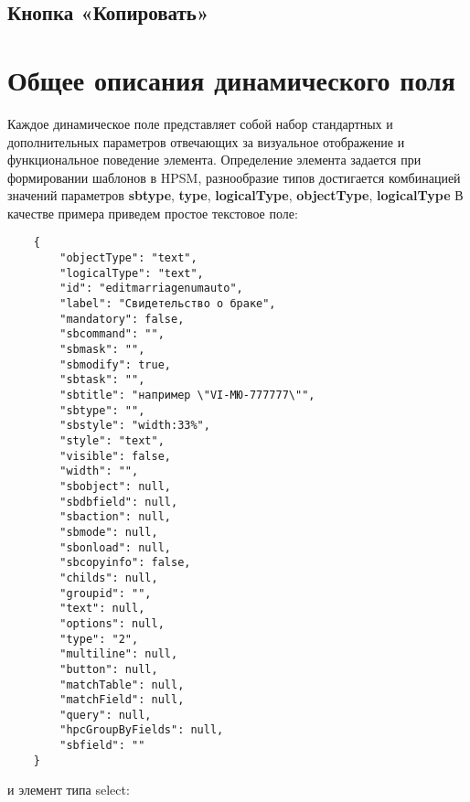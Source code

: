 \documentclass[../index.tex]{subfiles}
\begin{document}
\subsection{Кнопка «Копировать»}


\section{Общее описания динамического поля}
    Каждое динамическое поле представляет собой набор стандартных и дополнительных параметров отвечающих за визуальное отображение и функциональное поведение элемента.
    Определение элемента задается при формировании шаблонов в HPSM, разнообразие типов достигается комбинацией значений параметров \textbf{sbtype}, \textbf{type}, \textbf{logicalType}, \textbf{objectType}, \textbf{logicalType}
    В качестве примера приведем простое текстовое поле:
\begin{verbatim}
    {
        "objectType": "text",
        "logicalType": "text",
        "id": "editmarriagenumauto",
        "label": "Свидетельство о браке",
        "mandatory": false,
        "sbcommand": "",
        "sbmask": "",
        "sbmodify": true,
        "sbtask": "",
        "sbtitle": "например \"VI-МЮ-777777\"",
        "sbtype": "",
        "sbstyle": "width:33%",
        "style": "text",
        "visible": false,
        "width": "",
        "sbobject": null,
        "sbdbfield": null,
        "sbaction": null,
        "sbmode": null,
        "sbonload": null,
        "sbcopyinfo": false,
        "childs": null,
        "groupid": "",
        "text": null,
        "options": null,
        "type": "2",
        "multiline": null,
        "button": null,
        "matchTable": null,
        "matchField": null,
        "query": null,
        "hpcGroupByFields": null,
        "sbfield": ""
    }
\end{verbatim}
    и элемент типа select:
\end{document}
